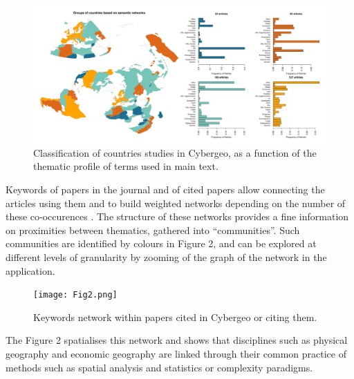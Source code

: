 \documentclass[11pt]{article}
\begin{document}
\begin{figure}[h!]
	\includegraphics[width=\linewidth]{Fig1.png}	
	\caption{Classification of countries studies in Cybergeo, as a function of the thematic profile of terms used in main text.}
\end{figure}

\bigskip


Keywords of papers in the journal and of cited papers allow connecting the articles using them and to build weighted networks depending on the number of these co-occurences \citep{chavalarias2013phylomemetic}. The structure of these networks provides a fine information on proximities between thematics, gathered into ``communities''. Such communities are identified by colours in Figure 2, and can be explored at different levels of granularity by zooming of the graph of the network in the application.


\begin{figure}[h!]
	\texttt{[image: Fig2.png]}	
	\caption{Keywords network within papers cited in Cybergeo or citing them.}
\end{figure}


\bigskip



The Figure 2 spatialises this network and shows that disciplines such as physical geography and economic geography are linked through their common practice of methods such as spatial analysis and statistics or complexity paradigms.


\bigskip
\end{document}
